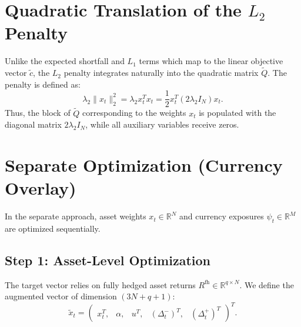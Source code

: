 \section{Quadratic Translation of the $L_2$ Penalty}

Unlike the expected shortfall and $L_1$ terms which map to the linear objective vector $\tilde{c}$, the $L_2$ penalty integrates naturally into the quadratic matrix $\tilde{Q}$. The penalty is defined as:
\begin{equation*}
    \lambda_2 \|x_t\|_2^2 = \lambda_2 x_t^T x_t = \frac{1}{2} x_t^T (2 \lambda_2 I_N) x_t.
\end{equation*}
Thus, the block of $\tilde{Q}$ corresponding to the weights $x_t$ is populated with the diagonal matrix $2 \lambda_2 I_N$, while all auxiliary variables receive zeros.

\section{Separate Optimization (Currency Overlay)}

In the separate approach, asset weights $x_t \in \mathbb{R}^N$ and currency exposures $\psi_t \in \mathbb{R}^M$ are optimized sequentially.

\subsection{Step 1: Asset-Level Optimization}
The target vector relies on fully hedged asset returns $R^{\text{fh}} \in \mathbb{R}^{q \times N}$. We define the augmented vector of dimension $(3N + q + 1)$:
\begin{equation*}
    \tilde{x}_t = \begin{pmatrix} x_t^T, & \alpha, & u^T, & (\Delta_t^-)^T, & (\Delta_t^+)^T \end{pmatrix}^T.
\end{equation*}


